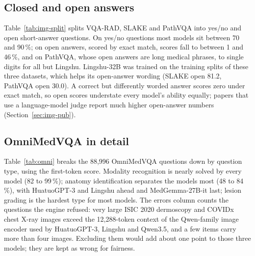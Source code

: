 \documentclass{article}
\newcommand{\fit}[1]{\adjustbox{max width=\textwidth}{#1}}
\newcommand{\pct}{\,\%}
\begin{document}
\subsection{Closed and open answers}

Table~\ref{tab:img-split} splits VQA-RAD, SLAKE and PathVQA into yes/no and open short-answer questions. On yes/no questions most models sit between 70 and 90\pct{}; on open answers, scored by exact match, scores fall to between 1 and 46\pct{}, and on PathVQA, whose open answers are long medical phrases, to single digits for all but Lingshu. Lingshu-32B was trained on the training splits of these three datasets, which helps its open-answer wording (SLAKE open 81.2, PathVQA open 30.0). A correct but differently worded answer scores zero under exact match, so open scores understate every model's ability equally; papers that use a language-model judge report much higher open-answer numbers (Section~\ref{sec:img-pub}).

\begin{table}[htbp]
\centering\footnotesize\setlength{\tabcolsep}{4pt}
\caption{Radiology and pathology VQA split into yes/no and open short-answer questions, in \pct{} (direct protocol, exact match for open answers).}
\label{tab:img-split}
\fit{}
\end{table}

\subsection{OmniMedVQA in detail}

Table~\ref{tab:omni} breaks the 88,996 OmniMedVQA questions down by question type, using the first-token score. Modality recognition is nearly solved by every model (82 to 99\pct{}); anatomy identification separates the models most (48 to 84\pct{}), with HuatuoGPT-3 and Lingshu ahead and MedGemma-27B-it last; lesion grading is the hardest type for most models. The errors column counts the questions the engine refused: very large ISIC 2020 dermoscopy and COVIDx chest X-ray images exceed the 12,288-token context of the Qwen-family image encoder used by HuatuoGPT-3, Lingshu and Qwen3.5, and a few items carry more than four images. Excluding them would add about one point to those three models; they are kept as wrong for fairness.

\begin{table}[htbp]
\centering\footnotesize\setlength{\tabcolsep}{3pt}
\caption{OmniMedVQA (88,996 questions) in detail, in \pct{}. Question-type columns use the first-token score. Errors = questions the engine refused, counted as wrong.}
\label{tab:omni}
\fit{}
\end{table}
\end{document}
